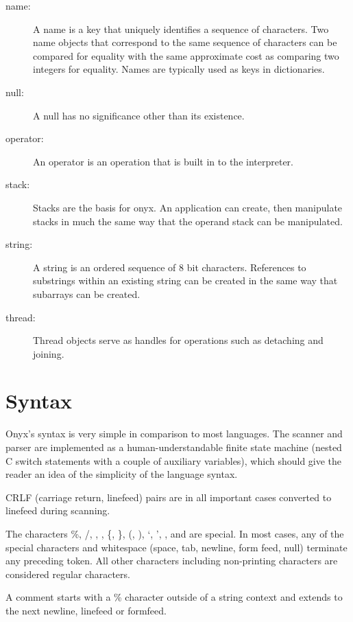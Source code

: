 \begin{description}
\item[name: ] A name is a key that uniquely identifies a sequence of characters.
Two name objects that correspond to the same sequence of characters can be
compared for equality with the same approximate cost as comparing two integers
for equality.  Names are typically used as keys in dictionaries.

\item[null: ] A null has no significance other than its existence.

\item[operator: ] An operator is an operation that is built in to the
interpreter.

\item[stack: ] Stacks are the basis for onyx.  An application can create, then
manipulate stacks in much the same way that the operand stack can be
manipulated.

\item[string: ] A string is an ordered sequence of 8 bit characters.  References
to substrings within an existing string can be created in the same way that
subarrays can be created.

\item[thread: ] Thread objects serve as handles for operations such as detaching
and joining.

\end{description}

\section{Syntax}

Onyx's syntax is very simple in comparison to most languages.  The scanner and
parser are implemented as a human-understandable finite state machine (nested C
switch statements with a couple of auxiliary variables), which should give the
reader an idea of the simplicity of the language syntax.

CRLF (carriage return, linefeed) pairs are in all important cases converted to
linefeed during scanning.

The characters \%, /, {\lb}, {\rb}, \{, \}, (, ), `, ', {\lt}, and {\gt} are
special.  In most cases, any of the special characters and whitespace (space,
tab, newline, form feed, null) terminate any preceding token.  All other
characters including non-printing characters are considered regular characters.

A comment starts with a \% character outside of a string context and extends to
the next newline, linefeed or formfeed.

